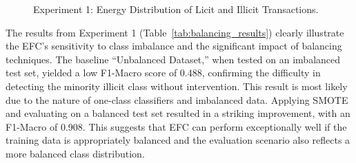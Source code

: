 \documentclass[12pt]{article}
\begin{document}
\begin{figure}[!tph]
  \centering
  \caption{Experiment 1: Energy Distribution of Licit and Illicit Transactions.}
\end{figure}

The results from Experiment 1 (Table~\ref{tab:balancing_results}) clearly illustrate the EFC's sensitivity to class imbalance
and the significant impact of balancing techniques. The baseline ``Unbalanced Dataset,'' when tested on an imbalanced test
set, yielded a low F1-Macro score of 0.488, confirming the difficulty in detecting the minority illicit class without
intervention. This result is most likely due to the nature of one-class classifiers and imbalanced data. Applying SMOTE
and evaluating on a balanced test set resulted in a striking improvement, with an F1-Macro of 0.908. This suggests that
EFC can perform exceptionally well if the training data is appropriately balanced and the evaluation scenario also reflects
a more balanced class distribution. 
\end{document}
